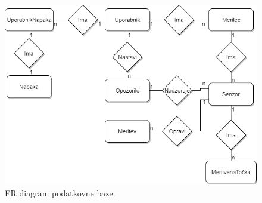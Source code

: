 \documentclass[12pt,a4paper,titlepage,openany]{report}
\begin{document}


\begin{figure}[H]
\begin{center}
\includegraphics[width=1\linewidth]{Slike/ER.png}
\end{center}
\caption{ER diagram podatkovne baze.}\label{slika:ER}
\end{figure}
\end{document}
